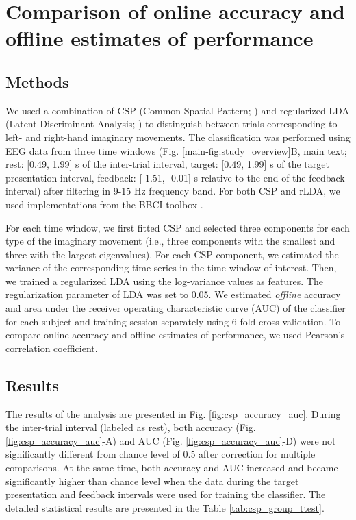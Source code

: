\section{Comparison of online accuracy and offline estimates of performance} \label{sec:csp_accuracy_auc}

\subsection{Methods}

We used a combination of CSP (Common Spatial Pattern; \cite{Ramoser2000}) and regularized LDA (Latent Discriminant Analysis; \cite{LDA_Friedman1989}) to distinguish between trials corresponding to left- and right-hand imaginary movements. The classification was performed using EEG data from three time windows (Fig. \ref{main-fig:study_overview}B, main text; rest: [0.49, 1.99] s of the inter-trial interval, target: [0.49, 1.99] s of the target presentation interval, feedback: [-1.51, -0.01] s relative to the end of the feedback interval) after filtering in 9-15 Hz frequency band. For both CSP and rLDA, we used implementations from the BBCI toolbox \citep{Blankertz2016}.

\medskip

For each time window, we first fitted CSP and selected three components for each type of the imaginary movement (i.e., three components with the smallest and three with the largest eigenvalues). For each CSP component, we estimated the variance of the corresponding time series in the time window of interest. Then, we trained a regularized LDA using the log-variance values as features. The regularization parameter of LDA was set to 0.05. We estimated \textit{offline} accuracy and area under the receiver operating characteristic curve (AUC) of the classifier for each subject and training session separately using 6-fold cross-validation. To compare online accuracy and offline estimates of performance, we used Pearson's correlation coefficient.

\subsection{Results}

The results of the analysis are presented in Fig. \ref{fig:csp_accuracy_auc}. During the inter-trial interval (labeled as rest), both accuracy (Fig. \ref{fig:csp_accuracy_auc}-A) and AUC (Fig. \ref{fig:csp_accuracy_auc}-D) were not significantly different from chance level of 0.5 after correction for multiple comparisons. At the same time, both accuracy and AUC increased and became significantly higher than chance level when the data during the target presentation and feedback intervals were used for training the classifier. The detailed statistical results are presented in the Table \ref{tab:csp_group_ttest}.

